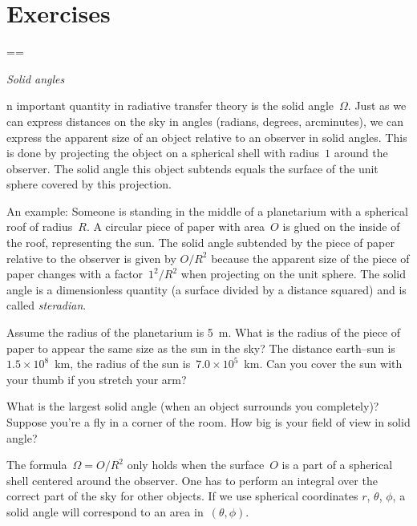 \documentclass[12pt]{article}
\numberwithin{equation}{section}
\newcommand{\opgave}[1]{\medbreak\item{\em #1}\par\nobreak\noindent\let\next}
\newcounter{vraag}	\newcounter{lastvraag}
\newenvironment{opgaven}%
    {\begin{list}{\arabic{vraag}.}{\usecounter{vraag}%
        \listparindent=\parindent \parsep=\parskip}}%
    {\setcounter{lastvraag}{\value{vraag}} \end{list}}
\newcounter{subvraag}	\newcounter{lastsubvraag}
\newenvironment{subvragen}%
    {\begin{list}{\alph{subvraag})}{\usecounter{subvraag}%
        \setlength{\rightmargin}{\leftmargin}}}%
    {\setcounter{lastsubvraag}{\value{subvraag}} \end{list}}
\begin{document}
\section{Exercises}
\begin{opgaven}

\opgave{Solid angles}

An important quantity in radiative transfer theory is the solid
angle~$\Omega$. Just as we can express distances on the sky in angles
(radians, degrees, arcminutes), we can express the apparent size of an
object relative to an observer in solid angles. This is done by
projecting the object on a spherical shell with radius~$1$ around the
observer. The solid angle this object subtends equals the surface of
the unit sphere covered by this projection.

An example: Someone is standing in the middle of a planetarium with a
spherical roof of radius~$R$. A circular piece of paper with area~$O$
is glued on the inside of the roof, representing the sun. The solid
angle subtended by the piece of paper relative to the observer is
given by $O / R^2$ because the apparent size of the piece of paper
changes with a factor~$1^2 / R^2$ when projecting on the unit
sphere. The solid angle is a dimensionless quantity (a surface divided
by a distance squared) and is called {\it steradian}.

\begin{subvragen}

\item Assume the radius of the planetarium is 5~m. What is the
radius of the piece of paper to appear the same size as the sun in the
sky? The distance earth--sun is~$1.5 \times 10^8$~km, the radius of
the sun is~$7.0 \times 10^5$~km. Can you cover the sun with your thumb
if you stretch your arm?

\item What is the largest solid angle (when an object surrounds you
completely)? Suppose you're a fly in a corner of the room. How big is
your field of view in solid angle?

\end{subvragen}

The formula~$\Omega = O / R^2$ only holds when the surface~$O$ is a
part of a spherical shell centered around the observer. One has to
perform an integral over the correct part of the sky for other
objects. If we use spherical coordinates $r$, $\theta$, $\phi$, a
solid angle will correspond to an area in~$(\theta,\phi)$. 


\end{opgaven}
\end{document}
